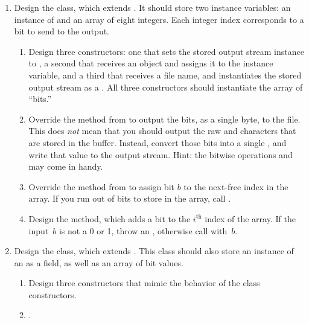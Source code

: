 \begin{enumerate}[label=(\alph*)]
    \item Design the  class, which extends . It should store two instance variables: an instance of  and an array of eight integers. Each integer index corresponds to a bit to send to the output.
    \begin{enumerate}[label=(\roman*)]
        \item Design three  constructors: one that sets the stored output stream instance to , a second that receives an  object and assigns it to the instance variable, and a third that receives a file name, and instantiates the stored output stream as a . All three constructors should instantiate the array of ``bits.''
        \item Override the  method from  to output the bits, as a single byte, to the file. This does \emph{not} mean that you should output the raw  and  characters that are stored in the buffer. Instead, convert those bits into a single , and write that value to the output stream. Hint: the bitwise operations \ttt{<<} and \ttt{|} may come in handy.
        \item Override the  method from  to assign bit $b$ to the next-free index in the array. If you run out of bits to store in the array, call . 
        \item Design the  method, which adds a bit to the $i^\text{th}$ index of the array. If the input~$b$ is not a 0 or 1, throw an , otherwise call  with~$b$.
    \end{enumerate}

    \item Design the  class, which extends . This class should also store an instance of an  as a field, as well as an array of bit values.
    \begin{enumerate}[label=(\roman*)]
        \item Design three  constructors that mimic the behavior of the  class constructors.
        \item {}.
    \end{enumerate}
\end{enumerate}

